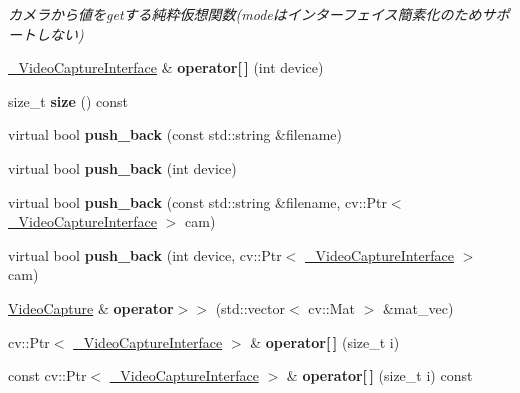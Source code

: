 \begin{DoxyCompactItemize}
\begin{DoxyCompactList}\small\item\em カメラから値をgetする純粋仮想関数(modeはインターフェイス簡素化のためサポートしない) \end{DoxyCompactList}\item 
\hypertarget{classskl_1_1_video_capture_a1c650a65c8072ea844ab9e247e5eae96}{}\label{classskl_1_1_video_capture_a1c650a65c8072ea844ab9e247e5eae96} 
\hyperlink{classskl_1_1___video_capture_interface}{\+\_\+\+Video\+Capture\+Interface} \& {\bfseries operator\mbox{[}$\,$\mbox{]}} (int device)
\item 
\hypertarget{classskl_1_1_video_capture_a4ba435f10c75843873e92dc08b2ac918}{}\label{classskl_1_1_video_capture_a4ba435f10c75843873e92dc08b2ac918} 
size\+\_\+t {\bfseries size} () const
\item 
\hypertarget{classskl_1_1_video_capture_a928fdf909a9f7afaecc2bce578bb0702}{}\label{classskl_1_1_video_capture_a928fdf909a9f7afaecc2bce578bb0702} 
virtual bool {\bfseries push\+\_\+back} (const std\+::string \&filename)
\item 
\hypertarget{classskl_1_1_video_capture_abc326dce402d6bab7daacfcc953eaf7f}{}\label{classskl_1_1_video_capture_abc326dce402d6bab7daacfcc953eaf7f} 
virtual bool {\bfseries push\+\_\+back} (int device)
\item 
\hypertarget{classskl_1_1_video_capture_aa10a352ee8e1e795607f6df8917f3c35}{}\label{classskl_1_1_video_capture_aa10a352ee8e1e795607f6df8917f3c35} 
virtual bool {\bfseries push\+\_\+back} (const std\+::string \&filename, cv\+::\+Ptr$<$ \hyperlink{classskl_1_1___video_capture_interface}{\+\_\+\+Video\+Capture\+Interface} $>$ cam)
\item 
\hypertarget{classskl_1_1_video_capture_ac5d9f95727f61e5a619bcb5becb41f6c}{}\label{classskl_1_1_video_capture_ac5d9f95727f61e5a619bcb5becb41f6c} 
virtual bool {\bfseries push\+\_\+back} (int device, cv\+::\+Ptr$<$ \hyperlink{classskl_1_1___video_capture_interface}{\+\_\+\+Video\+Capture\+Interface} $>$ cam)
\item 
\hypertarget{classskl_1_1_video_capture_a59c8002f5400c9701b14b0f8230e9d05}{}\label{classskl_1_1_video_capture_a59c8002f5400c9701b14b0f8230e9d05} 
\hyperlink{classskl_1_1_video_capture}{Video\+Capture} \& {\bfseries operator$>$$>$} (std\+::vector$<$ cv\+::\+Mat $>$ \&mat\+\_\+vec)
\item 
\hypertarget{classskl_1_1_video_capture_acb223f8f69501dfe3127a1769e251db1}{}\label{classskl_1_1_video_capture_acb223f8f69501dfe3127a1769e251db1} 
cv\+::\+Ptr$<$ \hyperlink{classskl_1_1___video_capture_interface}{\+\_\+\+Video\+Capture\+Interface} $>$ \& {\bfseries operator\mbox{[}$\,$\mbox{]}} (size\+\_\+t i)
\item 
\hypertarget{classskl_1_1_video_capture_ae1ab532c19ac61856952c81de149d594}{}\label{classskl_1_1_video_capture_ae1ab532c19ac61856952c81de149d594} 
const cv\+::\+Ptr$<$ \hyperlink{classskl_1_1___video_capture_interface}{\+\_\+\+Video\+Capture\+Interface} $>$ \& {\bfseries operator\mbox{[}$\,$\mbox{]}} (size\+\_\+t i) const
\end{DoxyCompactItemize}
